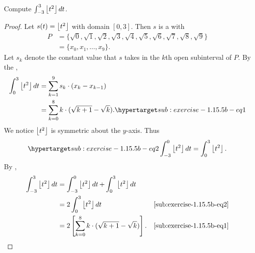 \documentclass{report}
\begin{document}
\subsubsection{}%

  Compute $\int_{-3}^3 \left\lfloor t^2\right\rfloor \mathop{dt}$.

  \begin{proof}
    Let $s(t) = \left\lfloor t^2\right\rfloor$ with domain $[0, 3]$.
    Then $s$ is a  with 
      \begin{align*}
        P
          & = \{\sqrt{0}, \sqrt{1}, \sqrt{2}, \sqrt{3}, \sqrt{4}, \sqrt{5},
                \sqrt{6}, \sqrt{7}, \sqrt{8}, \sqrt{9}\} \\
          & = \{x_0, x_1, \ldots, x_9\}.
      \end{align*}
    Let $s_k$ denote the constant value that $s$ takes in the $k$th open
      subinterval of $P$.
    By the ,
      \begin{align}
        \int_0^3 \floor{t^2} \mathop{dt}
          & = \sum_{k=1}^9 s_k \cdot (x_k - x_{k-1})
            \nonumber \\
          & = \sum_{k=0}^8 k \cdot (\sqrt{k + 1} - \sqrt{k}).
            \hyperlabel{sub:exercise-1.15.5b-eq1}
      \end{align}
    We notice $\left\lfloor t^2\right\rfloor$ is symmetric about the $y$-axis.
    Thus
      \begin{equation}
        \hyperlabel{sub:exercise-1.15.5b-eq2}
        \int_{-3}^0 \floor{t^2} \mathop{dt} = \int_0^3 \floor{t^2}.
      \end{equation}
    By ,
      \begin{align*}
        \int_{-3}^3 \left\lfloor t^2\right\rfloor \mathop{dt}
          & = \int_{-3}^0 \left\lfloor t^2\right\rfloor \mathop{dt} +
              \int_0^3 \left\lfloor t^2\right\rfloor \mathop{dt} \\
          & = 2\int_0^3 \left\lfloor t^2\right\rfloor \mathop{dt}
            & \eqref{sub:exercise-1.15.5b-eq2} \\
          & = 2 \left[\sum_{k=0}^8 k \cdot (\sqrt{k + 1} - \sqrt{k})\right].
            & \eqref{sub:exercise-1.15.5b-eq1}
      \end{align*}
  \end{proof}

\subsection{}%
\end{document}
